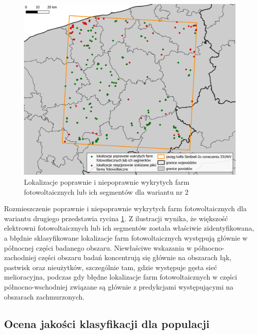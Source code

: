 \documentclass{amuthesis}
\begin{document}
\begin{figure}[t]

{\centering \includegraphics[width=1\textwidth,height=\textheight]{figures/poprawne_niepoprawne_wskazania_dataset2.png}

}

\caption{\label{fig-rycina-classification-results-dataset2}Lokalizacje
poprawnie i niepoprawnie wykrytych farm fotowoltaicznych lub ich
segmentów dla wariantu nr 2}

\end{figure}

Rozmieszczenie poprawnie i niepoprawnie wykrytych farm fotowoltaicznych
dla wariantu drugiego przedstawia rycina
\ref{fig-rycina-classification-results-dataset2}. Z ilustracji wynika,
że większość elektrowni fotowoltaicznych lub ich segmentów została
właściwie zidentyfikowana, a błędnie sklasyfikowane lokalizacje farm
fotowoltaicznych występują głównie w północnej części badanego obszaru.
Niewłaściwe wskazania w północno-zachodniej części obszaru badań
koncentrują się głównie na obszarach łąk, pastwisk oraz nieużytków,
szczególnie tam, gdzie występuje gęsta sieć melioracyjna, podczas gdy
błędne lokalizacje farm fotowoltaicznych w części północno-wschodniej
związane są głównie z predykcjami występującymi na obszarach
zachmurzonych.

\hypertarget{sec-population-quality-assessment}{%
\subsection{Ocena jakości klasyfikacji dla
populacji}\label{sec-population-quality-assessment}}
\end{document}
